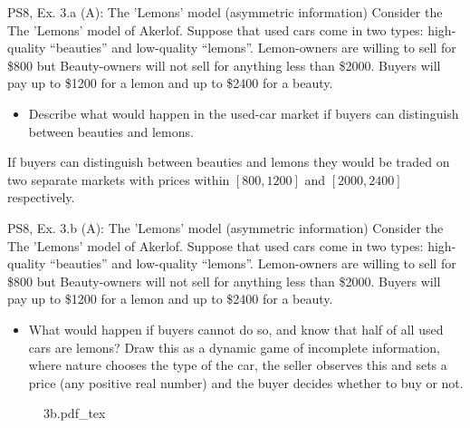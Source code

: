 \begin{frame}{PS8, Ex. 3.a (A): The 'Lemons' model (asymmetric information)}
    Consider the The 'Lemons' model of Akerlof. Suppose that used cars come in two types: high-quality “beauties” and low-quality “lemons”. Lemon-owners are willing to sell for \$800 but Beauty-owners will not sell for anything less than \$2000. Buyers will pay up to \$1200 for a lemon and up to \$2400 for a beauty.
    \begin{itemize}
      \item[(a)] Describe what would happen in the used-car market if buyers can distinguish between beauties and lemons.
    \end{itemize}
    If buyers can distinguish between beauties and lemons they would be traded on two separate markets with prices within $[800,1200]$ and $[2000,2400]$ respectively.
\end{frame}

\begin{frame}{PS8, Ex. 3.b (A): The 'Lemons' model (asymmetric information)}
    Consider the The 'Lemons' model of Akerlof. Suppose that used cars come in two types: high-quality “beauties” and low-quality “lemons”. Lemon-owners are willing to sell for \$800 but Beauty-owners will not sell for anything less than \$2000. Buyers will pay up to \$1200 for a lemon and up to \$2400 for a beauty.
    \vspace{-4pt}
    \begin{itemize}
      \item[(b)] What would happen if buyers cannot do so, and know that half of all used cars are lemons? Draw this as a dynamic game of incomplete information, where nature chooses the type of the car, the seller observes this and sets a price (any positive real number) and the buyer decides whether to buy or not.
    \end{itemize}
    \vspace{-8pt}
    \begin{figure}[!h]
      \center
      \def\svgwidth{.8\columnwidth}
      {3b.pdf_tex}
    \end{figure}
\end{frame}


